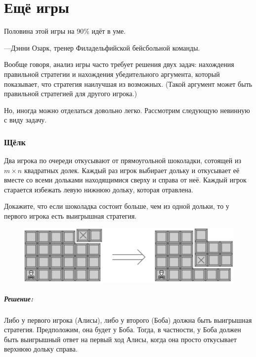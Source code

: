 \chapter*{Ещё игры}

\setlength{\epigraphwidth}{.6\textwidth}
\epigraph{Половина этой игры на 90\% идёт в уме.}{---Дэнни Озарк, тренер Филадельфийской бейсбольной команды.}

Вообще говоря, анализ игры часто требует решения двух задач: нахождения правильной стратегии и нахождения убедительного аргумента, который показывает, что стратегия наилучшая из возможных.
(Такой аргумент может быть правильной стратегией для другого игрока.)

Но, иногда можно отделаться довольно легко.
Рассмотрим следующую невинную с виду задачу.

\subsection*{Щёлк}%

Два игрока по очереди откусывают от прямоугольной шоколадки, сотоящей из $m \times n$ квадратных долек.
Каждый раз игрок выбирает дольку и откусывает её вместе со всеми дольками находящимися сверху и справа от неё.
Каждый игрок старается избежать левую нижнюю дольку, которая отравлена.

Докажите, что если шоколадка состоит больше, чем из одной дольки, то у первого игрока есть выигрышная стратегия.

\begin{figure}[h!]
\centering
\includegraphics[scale=0.5]{Figs/MoreGames/chomp}
\end{figure}

\paragraph{Решение:} Либо у первого игрока (Алисы), либо у второго (Боба) должна быть выигрышная стратегия.
Предположим, она будет у Боба.
Тогда, в частности, у Боба должен быть выигрышный ответ на первый ход Алисы, когда она просто откусывает верхнюю дольку справа.

